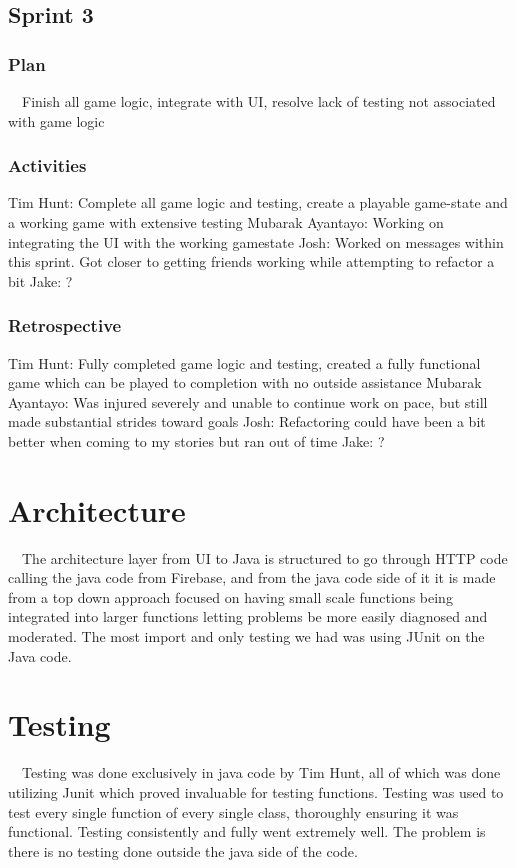 \documentclass[12pt]{article}
\begin{document}
\subsection{Sprint 3}
\subsubsection{Plan}
\ \ Finish all game logic, integrate with UI, resolve lack of testing not associated with game logic
\subsubsection{Activities}
Tim Hunt: Complete all game logic and testing, create a playable game-state and a working game with extensive testing \newline
 Mubarak Ayantayo: Working on integrating the UI with the working gamestate \newline
Josh: Worked on messages within this sprint. Got closer to getting friends working while attempting to refactor a bit \newline
Jake: ?
\subsubsection{Retrospective}
Tim Hunt: Fully completed game  logic and testing, created a fully functional game which can be played to completion with no outside assistance \newline
Mubarak Ayantayo: Was injured severely and unable to continue work on pace, but still made substantial strides toward goals \newline
Josh: Refactoring could have been a bit better when coming to my stories but ran out of time \newline
Jake: ?
\section{Architecture}
\ \ The architecture layer from UI to Java is structured to go through HTTP code calling the java code from Firebase, and from the java code side of it it is made from a top down approach focused on having small scale functions being integrated into larger functions letting problems be more easily diagnosed and moderated. The most import and only testing we had was using JUnit on the Java code.
\section{Testing}
\ \ Testing was done exclusively in java code by Tim Hunt, all of which was done utilizing Junit which proved invaluable for testing functions. Testing was used to test every single function of every single class, thoroughly ensuring it was functional. Testing consistently and fully went extremely well. The problem is there is no testing done outside the java side of the code.
\end{document}
